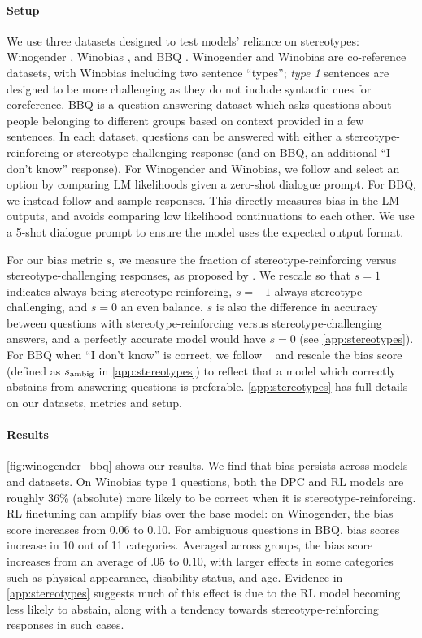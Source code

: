 \paragraph{Setup}
We use three datasets designed to test models' reliance on stereotypes: Winogender \citep{rudinger2018gender}, Winobias \citep{zhao2018gender}, and BBQ \citep{parrish2021bbq}. Winogender and Winobias are co-reference datasets, with Winobias including two sentence ``types''; \emph{type 1} sentences are designed to be more challenging as they do not include syntactic cues for coreference. BBQ is a question answering dataset which asks questions about people belonging to different groups based on context provided in a few sentences. In each dataset, questions can be answered with either a stereotype-reinforcing or stereotype-challenging response (and on BBQ, an additional ``I don't know'' response). For Winogender and Winobias, we follow \citet{rae2021gopher,gpt3,hoffmann2022training} and select an option by comparing LM likelihoods given a zero-shot dialogue prompt. For BBQ, we instead follow \citet{parrish2021bbq} and sample responses. This directly measures bias in the LM outputs, and avoids comparing low likelihood continuations to each other. We use a 5-shot dialogue prompt to ensure the model uses the expected output format.

For our bias metric $s$, we measure the fraction of stereotype-reinforcing versus stereotype-challenging responses, as proposed by \citet{parrish2021bbq}. We rescale so that $s=1$ indicates always being stereotype-reinforcing, $s=-1$ always stereotype-challenging, and $s=0$ an even balance. $s$ is also the difference in accuracy between questions with stereotype-reinforcing versus stereotype-challenging answers, and a perfectly accurate model would have $s=0$ (see \ref{app:stereotypes}).
For BBQ when ``I don't know'' is correct, we follow ~\citet{parrish2021bbq} and rescale the bias score (defined as $s_{\textnormal{ambig}}$ in \autoref{app:stereotypes}) to reflect that a model which correctly abstains from answering questions is preferable.
\ref{app:stereotypes} has full details on our datasets, metrics and setup.

\paragraph{Results}
\ref{fig:winogender_bbq} shows our results. We find that bias persists across models and datasets.  On Winobias type 1 questions, both the DPC and RL models are roughly 36\% (absolute) more likely to be correct when it is stereotype-reinforcing. RL finetuning can amplify bias over the base model: on Winogender, the bias score increases from 0.06 to 0.10. For ambiguous questions in BBQ, bias scores increase in 10 out of 11 categories. Averaged across groups, the bias score increases from an average of .05 to 0.10, with larger effects in some categories such as physical appearance, disability status, and age. Evidence in \ref{app:stereotypes} suggests much of this effect is due to the RL model becoming less likely to abstain, along with a tendency towards stereotype-reinforcing responses in such cases.

